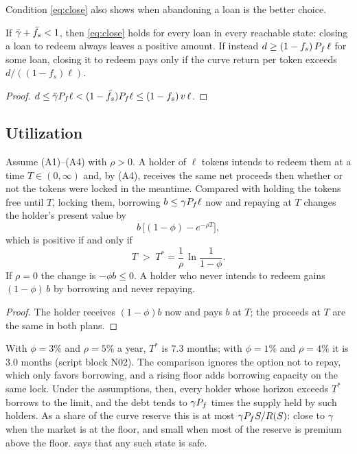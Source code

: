 Condition \eqref{eq:close} also shows when abandoning a loan is the better choice.

\begin{corollary}\label{cor:close}
If $\bar\gamma+\bar f_s<1$, then \eqref{eq:close} holds for every loan in every reachable state: closing a loan to redeem always leaves a positive amount. If instead $d\ge(1-f_s)\,P_f\,\ell$ for some loan, closing it to redeem pays only if the curve return per token exceeds $d/((1-f_s)\ell)$.
\end{corollary}
\begin{proof}
$d\le\bar\gamma P_f\ell<(1-\bar f_s)P_f\ell\le(1-f_s)\,v\,\ell$.
\end{proof}

\subsection{Utilization}

\begin{proposition}\label{prop:util}
Assume (A1)--(A4) with $\rho>0$. A holder of $\ell$ tokens intends to redeem them at a time $T\in(0,\infty)$ and, by (A4), receives the same net proceeds then whether or not the tokens were locked in the meantime. Compared with holding the tokens free until $T$, locking them, borrowing $b\le\gamma P_f\ell$ now and repaying at $T$ changes the holder's present value by
\begin{equation}\label{eq:util}
b\,\bigl[(1-\phi)-e^{-\rho T}\bigr],
\end{equation}
which is positive if and only if
\begin{equation}\label{eq:Tstar}
T\;>\;T^\ast=\frac{1}{\rho}\,\ln\frac{1}{1-\phi}.
\end{equation}
If $\rho=0$ the change is $-\phi b\le0$. A holder who never intends to redeem gains $(1-\phi)\,b$ by borrowing and never repaying.
\end{proposition}
\begin{proof}
The holder receives $(1-\phi)b$ now and pays $b$ at $T$; the proceeds at $T$ are the same in both plans.
\end{proof}

With $\phi=3\%$ and $\rho=5\%$ a year, $T^\ast$ is $7.3$ months; with $\phi=1\%$ and $\rho=4\%$ it is $3.0$ months (script block N02). The comparison ignores the option not to repay, which only favors borrowing, and a rising floor adds borrowing capacity on the same lock. Under the assumptions, then, every holder whose horizon exceeds $T^\ast$ borrows to the limit, and the debt tends to $\gamma P_f$ times the supply held by such holders. As a share of the curve reserve this is at most $\gamma P_f S/R(S)$: close to $\gamma$ when the market is at the floor, and small when most of the reserve is premium above the floor.  says that any such state is safe.


